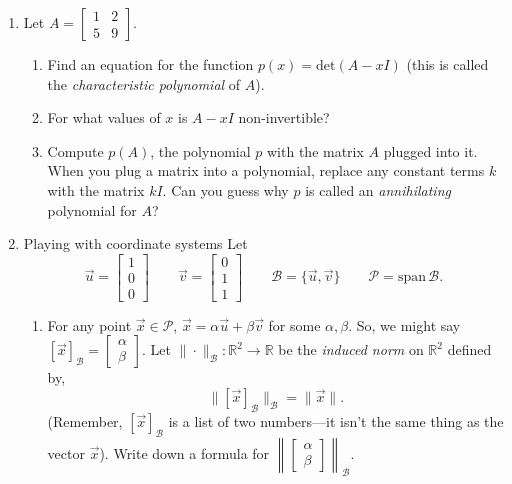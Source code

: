 \documentclass[letter]{article}
\newcommand{\R}{\mathbb{R}}
\newcommand{\Span}{\mathrm{span}}
\newcommand{\Det}{\mathrm{det}}
\newcommand{\mat}[1]{\begin{bmatrix}#1\end{bmatrix}}
\begin{document}
\begin{enumerate}
		\item Let $A=\mat{1&2\\5&9}$.
		\begin{enumerate}
			\item Find an equation for the function $p(x)=\Det(A-xI)$ (this is called the
				\emph{characteristic polynomial} of $A$).
			\item For what values of $x$ is $A-xI$ non-invertible?
			\item Compute $p(A)$, the polynomial $p$ with the matrix $A$ plugged into it.  When you plug a matrix
				into a polynomial, replace any constant terms $k$ with the matrix $kI$.
				Can you guess
				why $p$ is called an \emph{annihilating} polynomial for $A$?
		\end{enumerate}

		\item {\sc Playing with coordinate systems} Let
			\[
				\vec u=\mat{1\\0\\0}\qquad\vec v=\mat{0\\1\\1}\qquad \mathcal B=\{\vec u,\vec v\}\qquad \mathcal P=\Span\,\mathcal B.
			\]
			\begin{enumerate}
				\item 
				For any point $\vec x\in\mathcal P$, $\vec x=\alpha\vec u+\beta\vec v$ for some $\alpha,\beta$.
				So, we might say $[\vec x]_{\mathcal B} =\mat{\alpha\\\beta}$.  Let $\|\cdot\|_{\mathcal B}:\R^2\to\R$
				be the \emph{induced norm} on $\R^2$ defined by,
				\[
					\|[\vec x]_{\mathcal B}\|_{\mathcal B} = \|\vec x\|.
				\]
				(Remember, $[\vec x]_{\mathcal B}$ is a list of two numbers---it isn't the same thing as the vector $\vec x$).
				Write down a formula for $\left\|\mat{\alpha\\\beta}\right\|_{\mathcal B}$.


\end{enumerate}
\end{enumerate}
\end{document}
